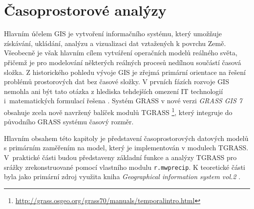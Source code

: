 \documentclass[a4paper,12pt,oneside]{report}
\begin{document}
\newpage
\setcounter{footnote}{1}
\section{Časoprostorové analýzy}

Hlavním účelem GIS je vytvoření informačního systému, který umožňuje
získá\-vání, ukládání, analýzu a vizualizaci dat vztažených k povrchu
Země.  Všeobecně je však hlavním cílem vytváření operačních modelů
reálného světa, přičemž je pro modelo\-vání některých reálných procesů
nedílnou součástí časová složka.  Z histo\-rického pohledu vývoje GIS
je zřejmá primární orientace na řešení problémů
prostorových dat bez časové  složky. V prvních fázích rozvoje GIS
nemohla ani být tato otázka z hlediska tehdejších omezení IT
technologií i~matematických formulací řešena
\cite{geospatialanal}. Systém GRASS v nové verzi \textit{GRASS
  GIS 7} obsahuje zcela nově navržený balíček modulů
\acs{TGRASS} \footnote{\url{http://grass.osgeo.org/grass70/manuals/temporalintro.html}},
který integruje do původního GRASS systému časový rozměr.

Hlavním obsahem této kapitoly je představení časoprostorových
datových modelů s primárním zaměřením na model, který je implementován
v modulech TGRASS. V~praktické části budou představeny základní funkce
a analýzy TGRASS pro  srážky zrekonstruované pomocí vlastního modulu
\texttt{r.mwprecip}. K teoretické části byla jako primární zdroj
využita kniha \textit{Geographical information system vol.2} \cite{gistemporal}.
\end{document}
